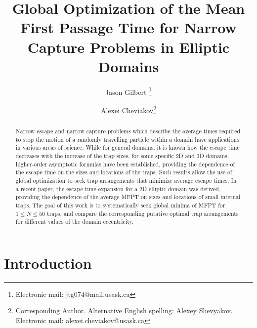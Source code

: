 \documentclass[11pt,letter,subeqn,fleqn]{article}
\title{Global Optimization of the Mean First Passage Time for Narrow Capture Problems in Elliptic Domains}
\author[1]{Jason Gilbert \thanks{Electronic mail: jtg074@mail.usask.ca}}
\author[1]{Alexei Cheviakov\thanks{Corresponding Author. Alternative English spelling: Alexey Shevyakov. Electronic mail: alexei.cheviakov@usask.ca}}
\affil[1]{Department of Mathematics and Statistics, University of Saskatchewan}
\begin{document}
\maketitle {}
\maketitle {}


\begin{abstract}

Narrow escape and narrow capture problems which describe the average times required to stop the motion of a randomly travelling particle within a domain have applications in various areas of science. While for general domains, it is known how the escape time decreases with the increase of the trap sizes, for some specific 2D and 3D domains,  higher-order asymptotic formulas have been established, providing the dependence of the escape time on the sizes and locations of the traps. Such results allow  the use of global optimization to seek trap arrangements that minimize average escape times. In a recent paper, the escape time expansion for a 2D elliptic domain was derived, providing the dependence of the average MFPT on sizes and locations of small internal traps. The goal of this work is to systematically seek global minima of MFPT for $1\leq N\leq 50$ traps, and compare the corresponding putative optimal trap arrangements for different values of the domain eccentricity.


\end{abstract}

\section{Introduction}
\end{document}

